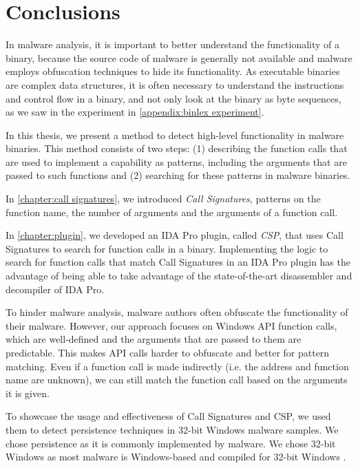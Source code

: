 \chapter{Conclusions}\label{chapter:conclusions}
In malware analysis, it is important to better understand the functionality of a binary, because the source code of malware is generally not available and malware employs obfuscation techniques to hide its functionality. As executable binaries are complex data structures, it is often necessary to understand the instructions and control flow in a binary, and not only look at the binary as byte sequences, as we saw in the experiment in \autoref{appendix:binlex experiment}.

\medskip

In this thesis, we present a method to detect high-level functionality in malware binaries. This method consists of two steps: (1) describing the function calls that are used to implement a capability as patterns, including the arguments that are passed to such functions and (2) searching for these patterns in malware binaries.

In \autoref{chapter:call signatures}, we introduced \emph{Call Signatures}, patterns on the function name, the number of arguments and the arguments of a function call.

In \autoref{chapter:plugin}, we developed an IDA Pro plugin, called \emph{CSP}, that uses Call Signatures to search for function calls in a binary. Implementing the logic to search for function calls that match Call Signatures in an IDA Pro plugin has the advantage of being able to take advantage of the state-of-the-art disassembler and decompiler of IDA Pro.

To hinder malware analysis, malware authors often obfuscate the functionality of their malware. However, our approach focuses on Windows API function calls, which are well-defined and the arguments that are passed to them are predictable. This makes API calls harder to obfuscate and better for pattern matching. Even if a function call is made indirectly (i.e. the address and function name are unknown), we can still match the function call based on the arguments it is given.

\medskip

To showcase the usage and effectiveness of Call Signatures and CSP, we used them to detect persistence techniques in 32-bit Windows malware samples. We chose persistence as it is commonly implemented by malware. We chose 32-bit Windows as most malware is Windows-based and compiled for 32-bit Windows \cite{windows-malware} \cite{64-bit-malware}.

